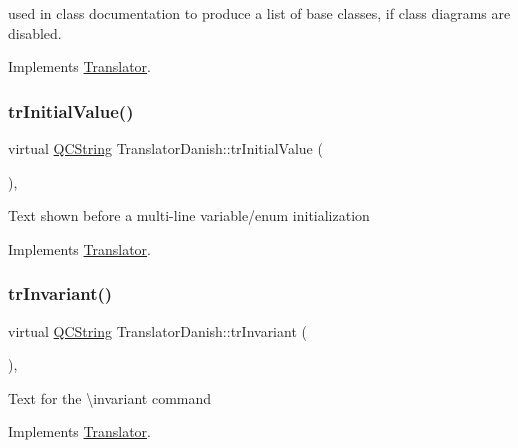 used in class documentation to produce a list of base classes, if class diagrams are disabled. 

Implements \mbox{\hyperlink{class_translator}{Translator}}.

\mbox{\label{class_translator_danish_a0b026a4d31f91df0600308066eae732f}} 
\subsubsection{\texorpdfstring{trInitialValue()}{trInitialValue()}}
{\footnotesize\ttfamily virtual \mbox{\hyperlink{class_q_c_string}{Q\+C\+String}} Translator\+Danish\+::tr\+Initial\+Value (\begin{DoxyParamCaption}{ }\end{DoxyParamCaption})\hspace{0.3cm}{\ttfamily [inline]}, {\ttfamily [virtual]}}

Text shown before a multi-\/line variable/enum initialization 

Implements \mbox{\hyperlink{class_translator}{Translator}}.

\mbox{\label{class_translator_danish_a3c0dd532545c73f1027c590e1260c83e}} 
\subsubsection{\texorpdfstring{trInvariant()}{trInvariant()}}
{\footnotesize\ttfamily virtual \mbox{\hyperlink{class_q_c_string}{Q\+C\+String}} Translator\+Danish\+::tr\+Invariant (\begin{DoxyParamCaption}{ }\end{DoxyParamCaption})\hspace{0.3cm}{\ttfamily [inline]}, {\ttfamily [virtual]}}

Text for the \textbackslash{}invariant command 

Implements \mbox{\hyperlink{class_translator}{Translator}}.

\mbox{\label{class_translator_danish_aab388740bbd2c158d96e721dbe39f218}} 
